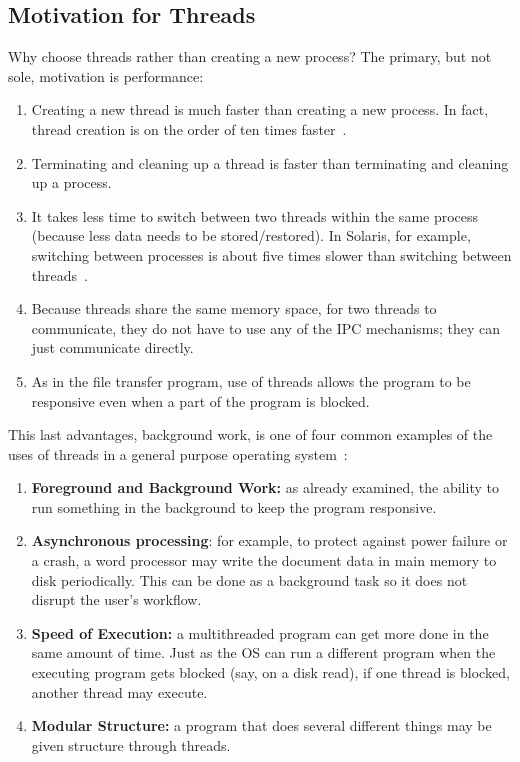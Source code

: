 \subsection*{Motivation for Threads}

Why choose threads rather than creating a new process? The primary, but not sole, motivation is performance:
\begin{enumerate}
	\item Creating a new thread is much faster than creating a new process. In fact, thread creation is on the order of ten times faster~\cite{machThreads}.
	\item Terminating and cleaning up a thread is faster than terminating and cleaning up a process.
	\item It takes less time to switch between two threads within the same process (because less data needs to be stored/restored). In Solaris, for example, switching between processes is about five times slower than switching between threads~\cite{osc}.
	\item Because threads share the same memory space, for two threads to communicate, they do not have to use any of the IPC mechanisms; they can just communicate directly.
	\item As in the file transfer program, use of threads allows the program to be responsive even when a part of the program is blocked.
\end{enumerate}

This last advantages, background work, is one of four common examples of the uses of threads in a general purpose operating system~\cite{insideOS2}:
\begin{enumerate}
	\item \textbf{Foreground and Background Work:} as already examined, the ability to run something in the background to keep the program responsive.
	\item \textbf{Asynchronous processing}: for example, to protect against power failure or a crash, a word processor may write the document data in main memory to disk periodically. This can be done as a background task so it does not disrupt the user's workflow.
	\item \textbf{Speed of Execution:} a multithreaded program can get more done in the same amount of time. Just as the OS can run a different program when the executing program gets blocked (say, on a disk read), if one thread is blocked, another thread may execute.
	\item \textbf{Modular Structure:} a program that does several different things may be given structure through threads.
\end{enumerate}

